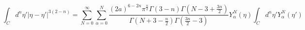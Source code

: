 \begin{equation}
\int_Cd^n\eta'|\eta - \eta'|^{3(2-n)} = 
\sum_{N=0}^{\infty}\sum_{\alpha = 0}^N
\frac{(2a)^{6-2n}{\pi}^{\frac{n}{2}}\Gamma(3-n)\Gamma(N-3+\frac{3n}{2})}{
\Gamma(N+3-\frac{n}{2})\Gamma(\frac{3n}{2}-3)}Y_{\alpha}^N({\eta})\int_Cd^n\eta'Y_{\alpha}^N(\eta')
\end{equation}

